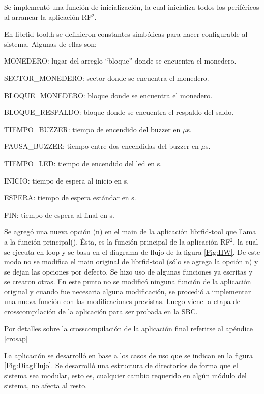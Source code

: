 Se implementó una función de inicialización, la cual inicializa todos los periféricos al arrancar la aplicación RF$^{2}$.

En librfid-tool.h se definieron constantes simbólicas para hacer configurable al sistema. Algunas de ellas son:

\bigskip
MONEDERO: lugar del arreglo “bloque” donde se encuentra el monedero.

SECTOR\_MONEDERO: sector donde se encuentra el monedero.

BLOQUE\_MONEDERO: bloque donde se encuentra el monedero.

BLOQUE\_RESPALDO: bloque donde se encuentra el respaldo del saldo.

TIEMPO\_BUZZER: tiempo de encendido del buzzer en $\mu$s.

PAUSA\_BUZZER: tiempo entre dos encendidas del buzzer en $\mu$s.

TIEMPO\_LED: tiempo de encendido del led en s.

INICIO: tiempo de espera al inicio en s. 

ESPERA: tiempo de espera estándar en s. 

FIN: tiempo de espera al final en s.


\bigskip
Se agregó una nueva opción (n) en el main de la aplicación librfid-tool que llama a la función principal(). Ésta, es la función principal de la aplicación RF$^{2}$, la cual se ejecuta en loop y se basa en el diagrama de flujo de la figura \ref{Fig:HW}. De este modo no se modifica el main original de librfid-tool (sólo se agrega la opción n) y se dejan las opciones por defecto.
Se hizo uso de algunas funciones ya escritas y se crearon otras. En este punto no se modificó ninguna función de la aplicación original y cuando fue necesaria alguna modificación, se procedió a implementar una nueva función con las modificaciones previstas.
Luego viene la etapa de crosscompilación de la aplicación para ser probada en la SBC.

\bigskip
Por detalles sobre la crosscompilación de la aplicación final referirse al apéndice \ref{crosap}

\bigskip
{}

La aplicación se desarrolló en base a los casos de uso que se indican en la figura \ref{Fig:DiagFlujo}.
Se desarrolló una estructura de directorios de forma que el sistema sea modular, esto es, cualquier cambio requerido en algún módulo del sistema, no afecta al resto.


